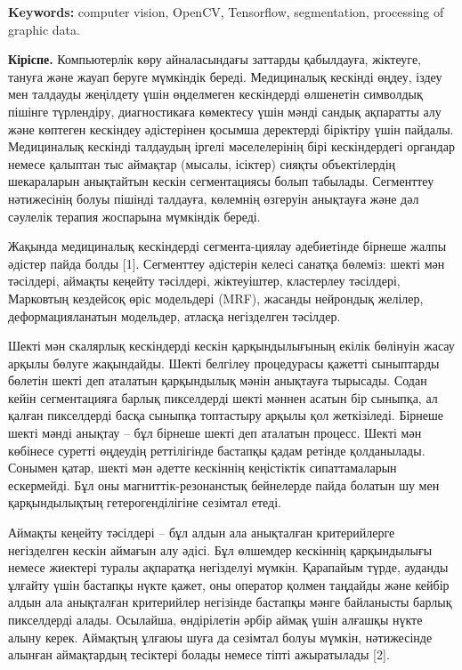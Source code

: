{\bfseries Keywords:} computer vision, OpenCV, Tensorflow, segmentation,
processing of graphic data.
\begin{multicols}{2}

{\bfseries Кіріспе.} Компьютерлік көру айналасындағы заттарды қабылдауға,
жіктеуге, тануға және жауап беруге мүмкіндік береді. Медициналық
кескінді өңдеу, іздеу мен талдауды жеңілдету үшін өңделмеген кескіндерді
өлшенетін символдық пішінге түрлендіру, диагностикаға көмектесу үшін
мәнді сандық ақпаратты алу және көптеген кескіндеу әдістерінен қосымша
деректерді біріктіру үшін пайдалы. Медициналық кескінді талдаудың іргелі
мәселелерінің бірі кескіндердегі органдар немесе қалыптан тыс аймақтар
(мысалы, ісіктер) сияқты объектілердің шекараларын анықтайтын кескін
сегментациясы болып табылады. Сегменттеу нәтижесінің болуы пішінді
талдауға, көлемнің өзгеруін анықтауға және дәл сәулелік терапия
жоспарына мүмкіндік береді.

Жақында медициналық кескіндерді сегмента-циялау әдебиетінде бірнеше жалпы
әдістер пайда болды {[}1{]}. Сегменттеу әдістерін келесі санатқа
бөлеміз: шекті мән тәсілдері, аймақты кеңейту тәсілдері, жіктеуіштер,
кластерлеу тәсілдері, Марковтың кездейсоқ өріс модельдері (MRF), жасанды
нейрондық желілер, деформацияланатын модельдер, атласқа негізделген
тәсілдер.

Шекті мән скалярлық кескіндерді кескін қарқындылығының екілік бөлінуін
жасау арқылы бөлуге жақындайды. Шекті белгілеу процедурасы қажетті
сыныптарды бөлетін шекті деп аталатын қарқындылық мәнін анықтауға
тырысады. Содан кейін сегментацияға барлық пикселдерді шекті мәннен
асатын бір сыныпқа, ал қалған пикселдерді басқа сыныпқа топтастыру
арқылы қол жеткізіледі. Бірнеше шекті мәнді анықтау -- бұл бірнеше шекті
деп аталатын процесс. Шекті мән көбінесе суретті өңдеудің реттілігінде
бастапқы қадам ретінде қолданылады. Сонымен қатар, шекті мән әдетте
кескіннің кеңістіктік сипаттамаларын ескермейді. Бұл оны
магниттік-резонанстық бейнелерде пайда болатын шу мен қарқындылықтың
гетерогенділігіне сезімтал етеді.

Аймақты кеңейту тәсілдері -- бұл алдын ала анықталған критерийлерге
негізделген кескін аймағын алу әдісі. Бұл өлшемдер кескіннің
қарқындылығы немесе жиектері туралы ақпаратқа негізделуі мүмкін.
Қарапайым түрде, ауданды ұлғайту үшін бастапқы нүкте қажет, оны оператор
қолмен таңдайды және кейбір алдын ала анықталған критерийлер негізінде
бастапқы мәнге байланысты барлық пикселдерді алады. Осылайша,
өндірілетін әрбір аймақ үшін алғашқы нүкте алыну керек. Аймақтың ұлғаюы
шуға да сезімтал болуы мүмкін, нәтижесінде алынған аймақтардың тесіктері
болады немесе тіпті ажыратылады {[}2{]}.


\end{multicols}
